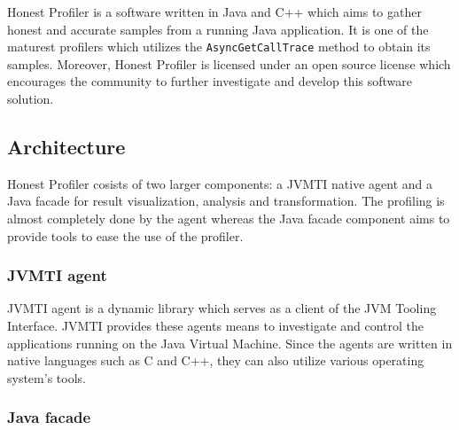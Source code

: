 \documentclass[..thesis.tex]{subfiles}
\begin{document}
Honest Profiler \cite{hon_prof} is a software written in Java and C++ which aims to gather honest and accurate samples from a running Java application. It is one of the maturest profilers which utilizes the \texttt{AsyncGetCallTrace} method to obtain its samples. Moreover, Honest Profiler is licensed under an open source license which encourages the community to further investigate and develop this software solution.

\subsection{Architecture}
Honest Profiler cosists of two larger components: a JVMTI native agent and a Java facade for result visualization, analysis and transformation. The profiling is almost completely done by the agent whereas the Java facade component aims to provide tools to ease the use of the profiler.

\subsubsection{JVMTI agent}
JVMTI agent is a dynamic library which serves as a client of the JVM Tooling Interface. JVMTI provides these agents means to investigate and control the applications running on the Java Virtual Machine. Since the agents are written in native languages such as C and C++, they can also utilize various operating system's tools.


\subsubsection{Java facade}
\end{document}
